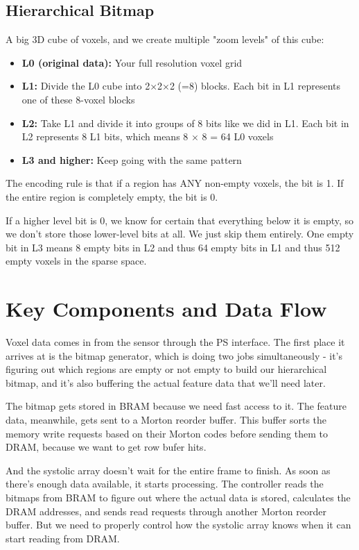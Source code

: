 \documentclass[12pt]{article}
\begin{document}
\subsection{Hierarchical Bitmap}

A big 3D cube of voxels, and we create multiple "zoom levels" of this cube:

\begin{itemize}
    \item \textbf{L0 (original data):} Your full resolution voxel grid
    \item \textbf{L1:} Divide the L0 cube into 2×2×2 (=8) blocks. Each bit in L1 represents one of these 8-voxel blocks
    \item \textbf{L2:} Take L1 and divide it into groups of 8 bits like we did in L1. Each bit in L2 represents 8 L1 bits, which means 8 $\times$ 8 = 64 L0 voxels
    \item \textbf{L3 and higher:} Keep going with the same pattern
\end{itemize}

The encoding rule is that if a region has ANY non-empty voxels, the bit is 1. If the entire region is completely empty, the bit is 0.

If a higher level bit is 0, we know for certain that everything below it is empty, so we don't store those lower-level bits at all. We just skip them entirely. One empty bit in L3 means 8 empty bits in L2 and thus 64 empty bits in L1 and thus 512 empty voxels in the sparse space.

\section{Key Components and Data Flow}

Voxel data comes in from the sensor through the PS interface. The first place it arrives at is the bitmap generator, which is doing two jobs simultaneously - it's figuring out which regions are empty or not empty to build our hierarchical bitmap, and it's also buffering the actual feature data that we'll need later.

The bitmap gets stored in BRAM because we need fast access to it. The feature data, meanwhile, gets sent to a Morton reorder buffer. This buffer sorts the memory write requests based on their Morton codes before sending them to DRAM, because we want to get row bufer hits.

And the systolic array doesn't wait for the entire frame to finish. As soon as there's enough data available, it starts processing. The controller reads the bitmaps from BRAM to figure out where the actual data is stored, calculates the DRAM addresses, and sends read requests through another Morton reorder buffer. But we need to properly control how the systolic array knows when it can start reading from DRAM.
\end{document}
